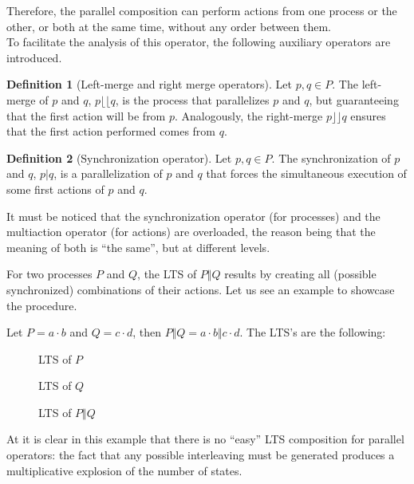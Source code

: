 \documentclass[11pt]{article}
\theoremstyle{definition}
\newtheorem{definition}{Definition}
\theoremstyle{plain}
\theoremstyle{definition}
\begin{document}
Therefore, the parallel composition can perform actions from one process or the other, or both at the same time, without any order between them. \\
To facilitate the analysis of this operator, the following auxiliary operators are introduced.
\begin{definition} [Left-merge and right merge operators]
	Let $ p, q \in P $. The left-merge of $ p $ and $ q $, $ p \lfloor\!\lfloor q $, is the process that parallelizes $ p $ and $ q $, but guaranteeing that the first action will be from $ p $. Analogously, the right-merge $ p \rfloor\!\rfloor q $ ensures that the first action performed comes from $ q $.
\end{definition} 
\begin{definition} [Synchronization operator]
	Let $ p, q \in P $. The synchronization of $ p $ and $ q $, $ p\vert q $, is a parallelization of $ p $ and $ q $ that forces the simultaneous execution of some first actions of $ p $ and $ q $.
\end{definition}
It must be noticed that the synchronization operator (for processes) and the multiaction operator (for actions) are overloaded, the reason being that the meaning of both is ``the same'', but at different levels.

For two processes $ P $ and $ Q $, the LTS of $ P \Vert Q $ results by creating all (possible synchronized) combinations of their actions. Let us see an example to showcase the procedure.

Let $ P = a·b $ and $ Q = c·d $, then $ P \Vert Q = a·b \Vert c·d $. The LTS's are the following:
\begin{figure} [H]
	\centering
	
	\caption{LTS of $ P $} \label{fig:ParallelCompositionP}
	\endminipage\hfill
	\centering
	
	\caption{LTS of $ Q $} \label{fig:ParallelCompositionQ}
	\endminipage\hfill
\end{figure}
\begin{figure} [H]
	\centering
	
	\caption{LTS of $ P \Vert Q$} \label{fig:ParallelCompositionPQ}
\end{figure}

At it is clear in this example that there is no ``easy'' LTS composition for parallel operators: the fact that any possible interleaving must be generated produces a multiplicative explosion of the number of states.
\end{document}
